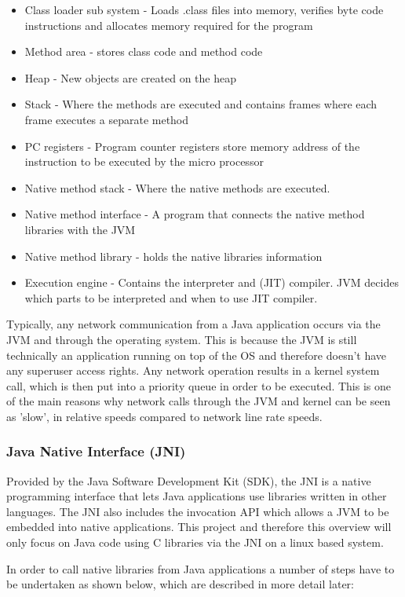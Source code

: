 \documentclass[final_report.tex]{subfiles}
\begin{document}
\begin{itemize}
	\item Class loader sub system - Loads .class files into memory, verifies byte code instructions and allocates memory required for the program
	\item Method area - stores class code and method code
	\item Heap - New objects are created on the heap
	\item Stack - Where the methods are executed and contains frames where each frame executes a separate method
	\item PC registers - Program counter registers store memory address of the instruction to be executed by the micro processor
	\item Native method stack - Where the native methods are executed.
	\item Native method interface - A program that connects the native method libraries with the JVM
	\item Native method library - holds the native libraries information
	\item Execution engine - Contains the interpreter and (JIT) compiler. JVM decides which parts to be interpreted and when to use JIT compiler.
\end{itemize}

Typically, any network communication from a Java application occurs via the JVM and through the operating system. This is because the JVM is still technically an application running on top of the OS and therefore doesn't have any superuser access rights. Any network operation results in a kernel system call, which is then put into a priority queue in order to be executed. This is one of the main reasons why network calls through the JVM and kernel can be seen as 'slow', in relative speeds compared to network line rate speeds.

\subsubsection{Java Native Interface (JNI)}
Provided by the Java Software Development Kit (SDK), the JNI is a native programming interface that lets Java applications use libraries written in other languages. The JNI also includes the invocation API which allows a JVM to be embedded into native applications. This project and therefore this overview will only focus on Java code using C libraries via the JNI on a linux based system.

In order to call native libraries from Java applications a number of steps have to be undertaken as shown below, which are described in more detail later:
\end{document}
